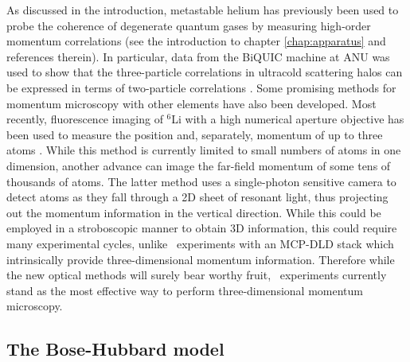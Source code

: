 	\noindent As discussed in the introduction, metastable helium has previously been used to probe the coherence of degenerate quantum gases by measuring high-order momentum correlations (see the introduction to chapter \ref{chap:apparatus} and references therein).
	In particular, data from the BiQUIC machine at ANU was used to show that the three-particle correlations in ultracold scattering halos can be expressed in terms of two-particle correlations \cite{Hodgman17}.	
	Some promising methods for momentum microscopy with other elements have also been developed. 
	Most recently, fluorescence imaging of $^6$Li with a high numerical aperture objective has been used to measure the position and, separately, momentum of up to three atoms  \cite{Bergschneider18}. 
	While this method is currently limited to small numbers of atoms in one dimension, another advance \cite{Bucker09} can image the far-field momentum of some tens of thousands of atoms.
	The latter method uses a single-photon sensitive camera to detect atoms as they fall through a 2D sheet of resonant light, thus projecting out the momentum information in the vertical direction. 
	While this could be employed in a stroboscopic manner to obtain 3D information, this could require many experimental cycles, unlike \mhe~experiments with an MCP-DLD stack which intrinsically provide three-dimensional momentum information.
	Therefore while the new optical methods will surely bear worthy fruit, \mhe~experiments currently stand as the most effective way to perform three-dimensional momentum microscopy.
	

	



	

\subsection{The Bose-Hubbard model}

